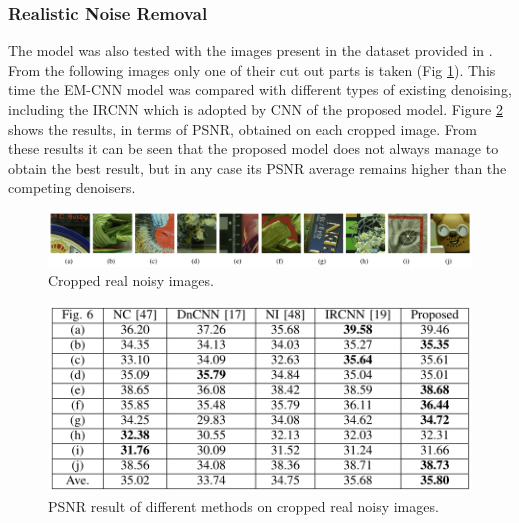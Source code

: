 \subsubsection{Realistic Noise Removal}
The model was also tested with the images present in the dataset provided 
in \cite{0884882845}. From the following images only one of their cut out parts is taken 
(Fig \ref{fig:crop}). This time the EM-CNN model was compared with different types 
of existing denoising, including the IRCNN which is adopted by CNN of the 
proposed model. Figure \ref{fig:cropRes} shows the results, in terms of PSNR, obtained on 
each cropped image. From these results it can be seen that the proposed 
model does not always manage to obtain the best result, but in any case its 
PSNR average remains higher than the competing denoisers.
\begin{figure}[h!]
    \centering
    \includegraphics[width = \linewidth]{images/paper7/crop.png}
    \centering
    \caption{Cropped real noisy images.}
    \label{fig:crop}
\end{figure}

\begin{figure}[h!]
    \centering
    \includegraphics[width = 0.8\linewidth]{images/paper7/crop result.png}
    \centering
    \caption{PSNR result of different methods on cropped real noisy images.}
    \label{fig:cropRes}
\end{figure}